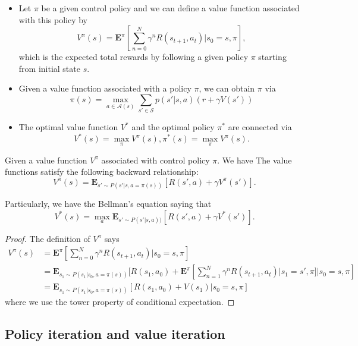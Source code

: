 \begin{refsection}
\begin{definition}\hfill
\begin{itemize}
	\item Let $\pi$ be a given control policy and we can define a value function associated with this policy by
	$$V^\pi(s) = \mathbf{E}^\pi[\sum_{n=0}^N \gamma^n R(s_{t+1}, a_t)|s_0 = s, \pi],$$
	which is the expected total rewards by following a given policy $\pi$ starting from initial state $s$.
	\item Given a value function associated with a policy $\pi$, we can obtain $\pi$ via
	$$\pi(s) = \max_{a\in\mathcal{A}(s)}\sum_{s' \in \mathcal{S}}p(s'|s,a)(r + \gamma V(s'))$$
	
	\item The optimal value function $V^*$ and the optimal policy $\pi^*$ are connected via
	$$V^*(s) = \max_{\pi} V^\pi(s), \pi^*(s) = \max_{\pi} V^\pi(s).$$
\end{itemize}	


\end{definition}


\begin{lemma}
Given a value function $V^\pi$ associated with control policy $\pi$. We have 
	The value functions satisfy the following backward relationship:
	$$V^\pi(s) = \mathbf{E}_{s'\sim P(s'|s, a = \pi(s))}[R(s',a)+ \gamma V^\pi(s')].$$
	
Particularly, we have the Bellman's equation saying that
		$$V^*(s) = \max_a\mathbf{E}_{s'\sim P(s'|s, a ))}[R(s',a)+ \gamma V^*(s')].$$

\end{lemma}
\begin{proof}
The definition of $V^\pi$ says
\begin{align*}
V^\pi(s) &= \mathbf{E}^\pi[\sum_{n=0}^N \gamma^n R(s_{t+1}, a_t)|s_0 = s, \pi]\\
&=\mathbf{E}_{s_1\sim P(s_1|s_0, a = \pi(s))} [R(s_{1}, a_0) + \mathbf{E}^\pi[\sum_{n=1}^N \gamma^n R(s_{t+1}, a_t)|s_1 = s', \pi]|s_0 = s, \pi]\\
&=\mathbf{E}_{s_1\sim P(s_1|s_0, a = \pi(s))} [R(s_{1}, a_0) + V(s_1)|s_0 = s, \pi]
\end{align*}
where we use the tower property of conditional expectation.
\end{proof}


\subsection{Policy iteration and value iteration}



\end{refsection}
